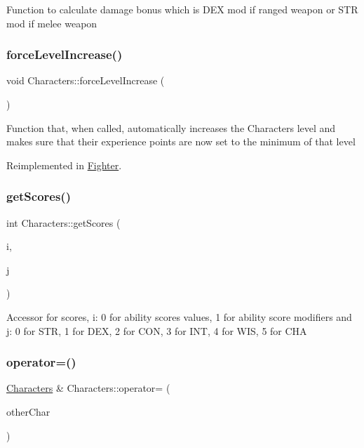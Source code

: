 Function to calculate damage bonus which is D\+EX mod if ranged weapon or S\+TR mod if melee weapon \hypertarget{class_characters_ac5909582bf15fe17b7a6fa5104c26dd6}{}\label{class_characters_ac5909582bf15fe17b7a6fa5104c26dd6} 
\subsubsection{\texorpdfstring{force\+Level\+Increase()}{forceLevelIncrease()}}
{\footnotesize\ttfamily void Characters\+::force\+Level\+Increase (\begin{DoxyParamCaption}{ }\end{DoxyParamCaption})\hspace{0.3cm}{\ttfamily [virtual]}}

Function that, when called, automatically increases the Character\textquotesingle{}s level and makes sure that their experience points are now set to the minimum of that level 

Reimplemented in \hyperlink{class_fighter_a774a40f8466eec10bee12b02e43e0aad}{Fighter}.

\hypertarget{class_characters_a498fb8e0caaa6503fbb1e1694a082c4c}{}\label{class_characters_a498fb8e0caaa6503fbb1e1694a082c4c} 
\subsubsection{\texorpdfstring{get\+Scores()}{getScores()}}
{\footnotesize\ttfamily int Characters\+::get\+Scores (\begin{DoxyParamCaption}\item[{int}]{i,  }\item[{int}]{j }\end{DoxyParamCaption})}

Accessor for scores, i\+: 0 for ability scores values, 1 for ability score modifiers and j\+: 0 for S\+TR, 1 for D\+EX, 2 for C\+ON, 3 for I\+NT, 4 for W\+IS, 5 for C\+HA \hypertarget{class_characters_a161bd4230b1ff594c36db697ee2d3707}{}\label{class_characters_a161bd4230b1ff594c36db697ee2d3707} 
\subsubsection{\texorpdfstring{operator=()}{operator=()}}
{\footnotesize\ttfamily \hyperlink{class_characters}{Characters} \& Characters\+::operator= (\begin{DoxyParamCaption}\item[{const \hyperlink{class_characters}{Characters} $\ast$}]{other\+Char }\end{DoxyParamCaption})}

